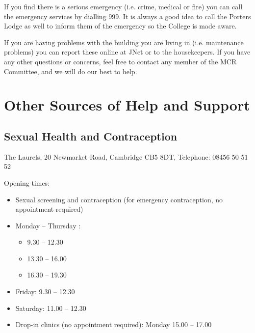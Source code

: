 \documentclass[11pt,fleqn, oneside]{book} %
\begin{document}
If you find there is a serious emergency (i.e. crime, medical or fire) you can call the emergency services by dialling 999. It is always a good idea to call the Porters Lodge as well to inform them of the emergency so the College is made aware.
   
If you are having problems with the building you are living in (i.e. maintenance problems) you can report these online at JNet or to the housekeepers. If you have any other questions or concerns, feel free to contact any member of the MCR Committee, and we will do our best to help.
    
\section{Other Sources of Help and Support}
    
\subsection{Sexual Health and Contraception}

The Laurels, 20 Newmarket Road, Cambridge CB5 8DT, Telephone: 08456 50 51 52

Opening times:
\begin{itemize}
\item Sexual screening and contraception (for emergency contraception, no appointment required)
\item Monday – Thursday : 
\begin{itemize}
\item 9.30 – 12.30
\item 13.30 – 16.00 
\item 16.30 – 19.30 
\end{itemize}
\item Friday:		9.30 – 12.30 
\item Saturday: 		11.00 – 12.30
\item Drop-in clinics (no appointment required): Monday 15.00 – 17.00 
\end{itemize}
\end{document}
